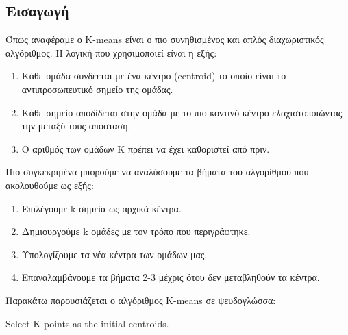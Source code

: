 \subsection{Εισαγωγή}
Όπως αναφέραμε ο K-means είναι ο πιο συνηθισμένος και απλός διαχωριστικός αλγόριθμος. Η λογική που χρησιμοποιεί είναι η εξής:
\begin{enumerate}
    \item Κάθε ομάδα συνδέεται με ένα κέντρο (centroid) το οποίο είναι το αντιπροσωπευτικό σημείο της ομάδας.
    \item Κάθε σημείο αποδίδεται στην ομάδα με το πιο κοντινό κέντρο ελαχιστοποιώντας την μεταξύ τους απόσταση.
    \item Ο αριθμός των ομάδων Κ πρέπει να έχει καθοριστεί από πριν.
\end{enumerate}

Πιο συγκεκριμένα μπορούμε να αναλύσουμε τα βήματα του αλγορίθμου που ακολουθούμε ως εξής:
\begin{enumerate}
    \item Επιλέγουμε k σημεία ως αρχικά κέντρα.
    \item Δημιουργούμε k ομάδες με τον τρόπο που περιγράφτηκε.
    \item Υπολογίζουμε τα νέα κέντρα των ομάδων μας.
    \item Επαναλαμβάνουμε τα βήματα 2-3 μέχρις ότου δεν μεταβληθούν τα κέντρα.
\end{enumerate}

Παρακάτω παρουσιάζεται ο αλγόριθμος K-means σε ψευδογλώσσα:\\
\noindent\begin{minipage}{0.9\linewidth}
\centering
\begin{algorithm}[H]
    Select K points as the initial centroids.\;
\end{algorithm}
\end{minipage}

